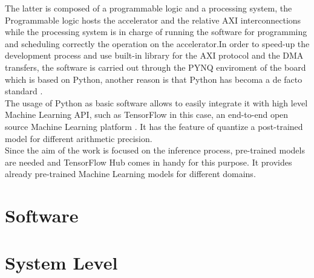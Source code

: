 The latter is composed of a programmable logic and a processing system, the Programmable logic hosts the accelerator and the relative AXI interconnections while the processing system is in charge of running the software for programming and scheduling correctly the operation on the accelerator.\newline In order to speed-up the development process and use built-in library for the AXI protocol and the DMA transfers, the software is carried out through the PYNQ enviroment of the board \cite{WEBSITE:2} which is based on Python, another reason is that Python has becoma a de facto standard \cite{paper:37}. \\
The usage of Python as basic software allows to easily integrate it with high level Machine Learning API, such as TensorFlow in this case, an end-to-end open source Machine Learning platform \cite{WEBSITE:4}. It has the feature of quantize a post-trained model for different arithmetic precision.\\
Since the aim of the work is focused on the inference process, pre-trained models are needed and TensorFlow Hub \cite{WEBSITE:5} comes in handy for this purpose. It provides already pre-trained Machine Learning models for different domains.

\section{Software}

\section{System Level}

